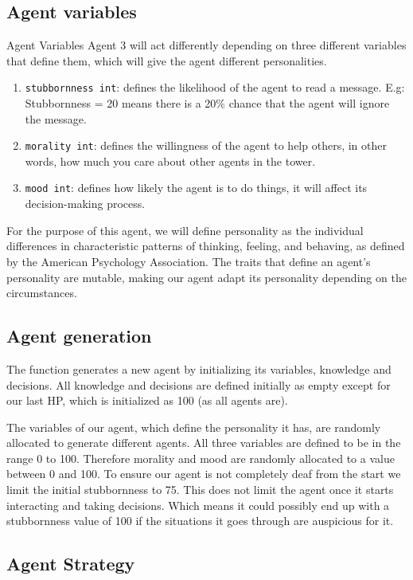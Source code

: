 \subsection{Agent variables}
Agent Variables
Agent 3 will act differently depending on three different variables that define them, which will give the agent different personalities.
\begin{enumerate}
    \item \texttt{stubbornness int}: defines the likelihood of the agent to read a message. E.g: Stubbornness = 20 means there is a 20\% chance that the agent will ignore the message.
    \item \texttt{morality int}: defines  the willingness of the agent to help others, in other words, how much you care about other agents in the tower. 
    \item \texttt{mood int}: defines how likely the agent is to do things, it will affect its decision-making process.
\end{enumerate}
For the purpose of this agent, we will define personality as the individual differences in characteristic patterns of thinking, feeling, and behaving, as defined by the American Psychology Association. The traits that define an agent's personality are mutable, making our agent adapt its personality depending on the circumstances. 

\subsection{Agent generation}
The function generates a new agent by initializing its variables, knowledge and decisions. All knowledge and decisions are defined initially as empty except for our last HP, which is initialized as 100 (as all agents are). \par
The variables of our agent, which define the personality it has, are randomly allocated to generate different agents. All three variables are defined to be in the range 0 to 100. Therefore morality and mood are randomly allocated to a value between 0 and 100. To ensure our agent is not completely deaf from the start we limit the initial stubbornness to 75. This does not limit the agent once it starts interacting and taking decisions. Which means it could possibly end up with a stubbornness value of 100 if the situations it goes through are auspicious for it.

\subsection{Agent Strategy}

